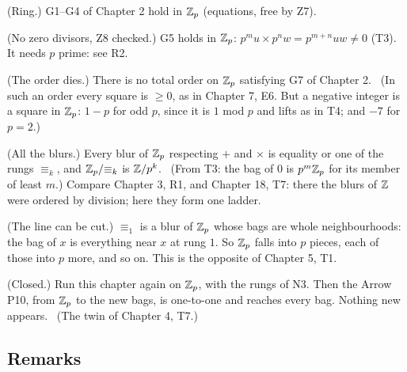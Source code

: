 \begin{lines}
\item[\lab{T5}] (Ring.) G1--G4 of Chapter 2 hold in $\mathbb{Z}_p$ (equations, free by Z7).
\item[\lab{T6}] (No zero divisors, Z8 checked.) G5 holds in $\mathbb{Z}_p$: $p^m u \times p^n w = p^{m+n} u w \neq 0$ (T3). It needs $p$ prime: see R2.
\item[\lab{T7}] (The order dies.) There is no total order on $\mathbb{Z}_p$ satisfying G7 of Chapter 2. \ (In such an order every square is $\ge 0$, as in Chapter 7, E6. But a negative integer is a square in $\mathbb{Z}_p$: $1 - p$ for odd $p$, since it is $1$ mod $p$ and lifts as in T4; and $-7$ for $p = 2$.)
\item[\lab{T8}] (All the blurs.) Every blur of $\mathbb{Z}_p$ respecting $+$ and $\times$ is equality or one of the rungs $\equiv_k$, and $\mathbb{Z}_p / {\equiv_k}$ is $\mathbb{Z}/p^k$. \ (From T3: the bag of $0$ is $p^m \mathbb{Z}_p$ for its member of least $m$.) Compare Chapter 3, R1, and Chapter 18, T7: there the blurs of $\mathbb{Z}$ were ordered by division; here they form one ladder.
\item[\lab{T9}] (The line can be cut.) $\equiv_1$ is a blur of $\mathbb{Z}_p$ whose bags are whole neighbourhoods: the bag of $x$ is everything near $x$ at rung $1$. So $\mathbb{Z}_p$ falls into $p$ pieces, each of those into $p$ more, and so on. This is the opposite of Chapter 5, T1.
\item[\lab{T10}] (Closed.) Run this chapter again on $\mathbb{Z}_p$, with the rungs of N3. Then the Arrow P10, from $\mathbb{Z}_p$ to the new bags, is one-to-one and reaches every bag. Nothing new appears. \ (The twin of Chapter 4, T7.)
\end{lines}

\subsection*{Remarks}

